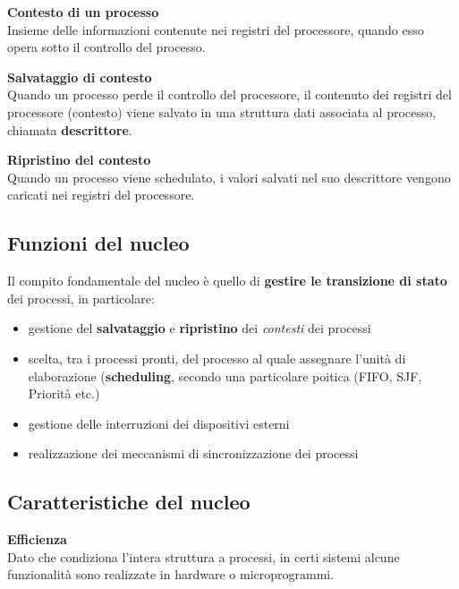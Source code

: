 \begin{mdframed}[topline=false,bottomline=false,rightline=false]
\textbf{Contesto di un processo}\\
Insieme delle informazioni contenute nei registri del processore, quando esso opera sotto il controllo del processo.
\end{mdframed}

\begin{mdframed}[topline=false,bottomline=false,rightline=false]
\textbf{Salvataggio di contesto}\\
Quando un processo perde il controllo del processore, il contenuto dei registri del processore (contesto) viene salvato in una struttura dati associata al processo, chiamata \textbf{descrittore}.
\end{mdframed}

\begin{mdframed}[topline=false,bottomline=false,rightline=false]
\textbf{Ripristino del contesto}\\
Quando un processo viene schedulato, i valori salvati nel suo descrittore vengono caricati nei registri del processore.
\end{mdframed}

\subsection{Funzioni del nucleo}
Il compito fondamentale del nucleo è quello di \textbf{gestire le transizione di stato} dei processi, in particolare:
\begin{itemize}
    \item gestione del \textbf{salvataggio} e \textbf{ripristino} dei \textit{contesti} dei processi
    \item scelta, tra i processi pronti, del processo al quale assegnare l'unità di elaborazione (\textbf{scheduling}, secondo una particolare poitica (FIFO, SJF, Priorità etc.)
    \item gestione delle interruzioni dei dispositivi esterni
    \item realizzazione dei meccanismi di sincronizzazione dei processi
\end{itemize}

\subsection{Caratteristiche del nucleo}
\begin{mdframed}[topline=false,bottomline=false,rightline=false]
\textbf{Efficienza}\\
Dato che condiziona l'intera struttura a processi, in certi sistemi alcune funzionalità sono realizzate in hardware o microprogrammi.
\end{mdframed}

